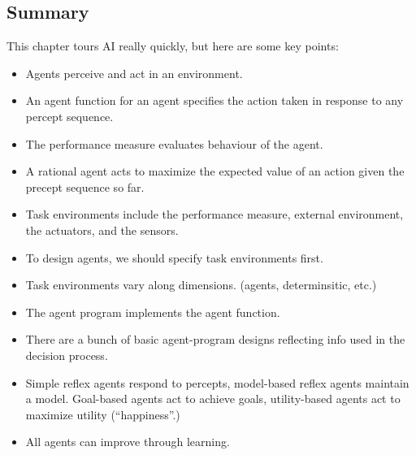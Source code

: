 
\subsection{Summary} %
\label{sub:summary}

This chapter tours AI really quickly, but here are some key points:
\begin{itemize}
    \item Agents perceive and act in an environment.
    \item An agent function for an agent specifies the action taken in response
    to any percept sequence.
    \item The performance measure evaluates behaviour of the agent.
    \item A rational agent acts to maximize the expected value of an action
    given the precept sequence so far.
    \item Task environments include the performance measure, external
    environment, the actuators, and the sensors.
    \item To design agents, we should specify task environments first.
    \item Task environments vary along dimensions. (agents, determinsitic, etc.)
    \item The agent program implements the agent function.
    \item There are a bunch of basic agent-program designs reflecting info used
    in the decision process.
    \item Simple reflex agents respond to percepts, model-based reflex agents
    maintain a model.
    Goal-based agents act to achieve goals, utility-based
    agents act to maximize utility (``happiness''.)
    \item All agents can improve through learning.
\end{itemize}



